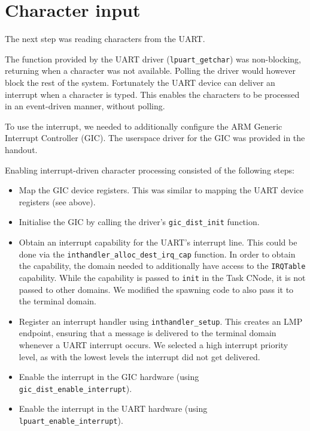 \section{Character input}

The next step was reading characters from the UART.

The function provided by the UART driver (\verb|lpuart_getchar|) was non-blocking, returning when a character was not available.
Polling the driver would however block the rest of the system.
Fortunately the UART device can deliver an interrupt when a character is typed.
This enables the characters to be processed in an event-driven manner, without polling.

To use the interrupt, we needed to additionally configure the ARM Generic Interrupt Controller (GIC).
The userspace driver for the GIC was provided in the handout.

Enabling interrupt-driven character processing consisted of the following steps:

\begin{itemize}

    \item
        Map the GIC device registers. This was similar to mapping the UART device registers (see above).

    \item
        Initialise the GIC by calling the driver's \verb|gic_dist_init| function.

    \item
        Obtain an interrupt capability for the UART's interrupt line.
        This could be done via the \verb|inthandler_alloc_dest_irq_cap| function.
        In order to obtain the capability, the domain needed to additionally have access to the \verb|IRQTable| capability.
        While the capability is passed to \verb|init| in the Task CNode, it is not passed to other domains.
        We modified the spawning code to also pass it to the terminal domain.

    \item
        Register an interrupt handler using \verb|inthandler_setup|.
        This creates an LMP endpoint, ensuring that a message is delivered to the terminal domain whenever a UART interrupt occurs.
        We selected a high interrupt priority level, as with the lowest levels the interrupt did not get delivered.

    \item
        Enable the interrupt in the GIC hardware (using \verb|gic_dist_enable_interrupt|).

    \item
        Enable the interrupt in the UART hardware (using \verb|lpuart_enable_interrupt|).

\end{itemize}

